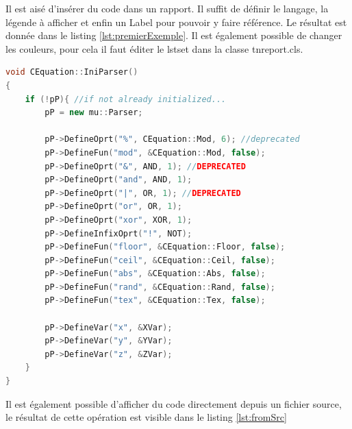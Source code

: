 \documentclass{tnreport}
\begin{document}
Il est aisé d'insérer du code dans un rapport. Il suffit de définir le langage, la légende à afficher et enfin un Label pour pouvoir y faire référence. Le résultat est donnée dans le listing \ref{lst:premierExemple}. Il est également possible de changer les couleurs, pour cela il faut éditer le lstset dans la classe tnreport.cls.

\begin{lstlisting}[language=c++, caption={Premier Exemple}, label={lst:premierExemple}]
void CEquation::IniParser()
{
	if (!pP){ //if not already initialized...
		pP = new mu::Parser;

		pP->DefineOprt("%", CEquation::Mod, 6); //deprecated
		pP->DefineFun("mod", &CEquation::Mod, false);
		pP->DefineOprt("&", AND, 1); //DEPRECATED
		pP->DefineOprt("and", AND, 1);
		pP->DefineOprt("|", OR, 1); //DEPRECATED
		pP->DefineOprt("or", OR, 1);
		pP->DefineOprt("xor", XOR, 1);
		pP->DefineInfixOprt("!", NOT);
		pP->DefineFun("floor", &CEquation::Floor, false);
		pP->DefineFun("ceil", &CEquation::Ceil, false);
		pP->DefineFun("abs", &CEquation::Abs, false);
		pP->DefineFun("rand", &CEquation::Rand, false);
		pP->DefineFun("tex", &CEquation::Tex, false);
	
		pP->DefineVar("x", &XVar);
		pP->DefineVar("y", &YVar);
		pP->DefineVar("z", &ZVar);
	}
}
\end{lstlisting}
\clearpage
Il est également possible d'afficher du code directement depuis un fichier source, le résultat de cette opération est visible dans le listing \ref{lst:fromSrc}

\end{document}
